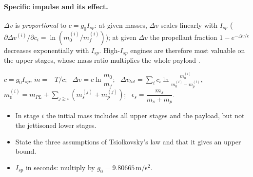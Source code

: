 \paragraph{Specific impulse and its effect.} $\Delta v$ is \emph{proportional} to $c=g_0I_{sp}$: at given masses, $\Delta v$ scales linearly
with $I_{sp}$ ($\partial\Delta v^{(i)}/\partial c_i=\ln(m_0^{(i)}/m_f^{(i)})$); at given $\Delta v$ the propellant fraction
$1-e^{-\Delta v/c}$ decreases exponentially with $I_{sp}$. High-$I_{sp}$ engines are therefore most valuable on the upper stages,
whose mass ratio multiplies the whole payload \notinnotes.

\begin{keyf}
$c=g_0I_{sp}$, $\dot m=-T/c$; \ $\Delta v=c\ln\dfrac{m_0}{m_f}$; \ $\Delta v_{tot}=\displaystyle\sum_i c_i\ln\frac{m_0^{(i)}}{m_0^{(i)}-m_p^{(i)}}$,
$m_0^{(i)}=m_{PL}+\displaystyle\sum_{j\ge i}(m_s^{(j)}+m_p^{(j)})$; \ $\epsilon_s=\dfrac{m_s}{m_s+m_p}$.
\end{keyf}

\pitfalls
\begin{itemize}
\item In stage $i$ the initial mass includes all upper stages and the payload, but not the jettisoned lower stages.
\item State the three assumptions of Tsiolkovsky's law and that it gives an upper bound.
\item $I_{sp}$ in seconds: multiply by $g_0=9.80665$\,m/s$^2$.
\end{itemize}

